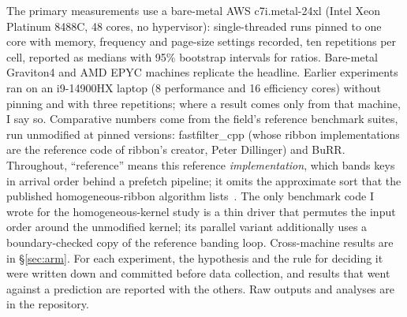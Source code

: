 \documentclass[a4paper,UKenglish,cleveref,autoref,thm-restate,anonymous]{lipics-v2021}
\begin{document}
The primary measurements use a bare-metal AWS c7i.metal-24xl (Intel Xeon Platinum 8488C, 48 cores, no hypervisor): single-threaded runs pinned to one core with memory, frequency and page-size settings recorded, ten repetitions per cell, reported as medians with 95\% bootstrap intervals for ratios. Bare-metal Graviton4 and AMD EPYC machines replicate the headline. Earlier experiments ran on an i9-14900HX laptop (8 performance and 16 efficiency cores) without pinning and with three repetitions; where a result comes only from that machine, I say so. Comparative numbers come from the field's reference benchmark suites, run unmodified at pinned versions: fastfilter\_cpp (whose ribbon implementations are the reference code of ribbon's creator, Peter Dillinger) and BuRR. Throughout, ``reference'' means this reference \emph{implementation}, which bands keys in arrival order behind a prefetch pipeline; it omits the approximate sort that the published homogeneous-ribbon algorithm lists~\cite{dietzfelbinger2026ribbon}. The only benchmark code I wrote for the homogeneous-kernel study is a thin driver that permutes the input order around the unmodified kernel; its parallel variant additionally uses a boundary-checked copy of the reference banding loop. Cross-machine results are in \S\ref{sec:arm}. For each experiment, the hypothesis and the rule for deciding it were written down and committed before data collection, and results that went against a prediction are reported with the others. Raw outputs and analyses are in the repository.
\end{document}
